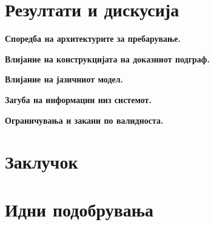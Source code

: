 \documentclass[14pt]{extarticle}
\begin{document}
\section{Резултати и дискусија}

\textbf{Споредба на архитектурите за пребарување.}

\textbf{Влијание на конструкцијата на доказниот подграф.}

\textbf{Влијание на јазичниот модел.}

\textbf{Загуба на информации низ системот.}

\textbf{Ограничувања и закани по валидноста.}

\section{Заклучок}

\section{Идни подобрувања}



\end{document}
